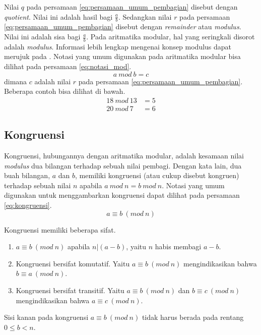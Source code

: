 Nilai $q$ pada persamaan \eqref{eq:persamaan_umum_pembagian} disebut dengan \textit{quotient}. Nilai ini adalah hasil bagi $\frac{a}{b}$. Sedangkan nilai $r$ pada persamaan \eqref{eq:persamaan_umum_pembagian} disebut dengan \textit{remainder} atau \textit{modulus}. Nilai ini adalah sisa bagi $\frac{a}{b}$. Pada aritmatika modular, hal yang seringkali disorot adalah \textit{modulus}. Informasi lebih lengkap mengenai konsep modulus dapat merujuk pada \cite{stallings_cryptography}. Notasi yang umum digunakan pada aritmatika modular bisa dilihat pada persamaan \eqref{eq:notasi_mod}.
\begin{equation}
a\ mod\ b=c
\label{eq:notasi_mod}
\end{equation}
dimana $c$ adalah nilai $r$ pada persamaan \eqref{eq:persamaan_umum_pembagian}. Beberapa contoh bisa dilihat di bawah.
\begin{align*}
18\ mod\ 13 & = 5 \\
20\ mod\ 7 & = 6
\end{align*}

\subsection{Kongruensi}
Kongruensi, hubungannya dengan aritmatika modular, adalah kesamaan nilai \textit{modulus} dua bilangan terhadap sebuah nilai pembagi. Dengan kata lain, dua buah bilangan, $a$ dan $b$, memiliki kongruensi (atau cukup disebut kongruen) terhadap sebuah nilai $n$ apabila $a\ mod\ n=b\ mod\ n$. Notasi yang umum digunakan untuk menggambarkan kongruensi dapat dilihat pada persamaan \eqref{eq:kongruensi}.
\begin{equation}
a\equiv b\ (mod\ n)
\label{eq:kongruensi}
\end{equation}

Kongruensi memiliki beberapa sifat.\cite{stallings_cryptography}
\begin{enumerate}
\item $a\equiv b\ (mod\ n)$ apabila $n|(a - b)$, yaitu $n$ habis membagi $a-b$.
\item Kongruensi bersifat komutatif. Yaitu $a\equiv b\ (mod\ n)$ mengindikasikan bahwa $b\equiv a\ (mod\ n)$.
\item Kongruensi bersifat transitif. Yaitu $a\equiv b\ (mod\ n)$ dan $b\equiv c\ (mod\ n)$ mengindikasikan bahwa $a\equiv c\ (mod\ n)$.
\end{enumerate}
Sisi kanan pada kongruensi $a\equiv b\ (mod\ n)$ tidak harus berada pada rentang $0\le b<n$.

